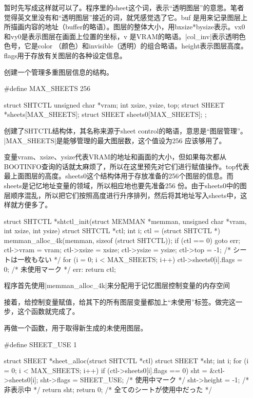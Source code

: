 暂时先写成这样就可以了。程序里的sheet这个词，表示“透明图层”的意思。笔者觉得英文里没有和“透明图层”接近的词，就凭感觉选了它。buf 是用来记录图层上所描画内容的地址（buffer的略语）。图层的整体大小，用bxsize*bysize表示。vx0和vy0是表示图层在画面上位置的坐标，v 是VRAM的略语。|col_inv|表示透明色色号，它是color （颜色）和invisible（透明）的组合略语。height表示图层高度。flags用于存放有关图层的各种设定信息。

创建一个管理多重图层信息的结构。

\begin{code}
#define MAX_SHEETS      256

struct SHTCTL {
    unsigned char *vram;
    int xsize, ysize, top;
    struct SHEET *sheets[MAX_SHEETS];
    struct SHEET sheets0[MAX_SHEETS];
};
\end{code}

创建了SHTCTL结构体，其名称来源于sheet control的略语，意思是“图层管理”。 |MAX_SHEETS|是能够管理的最大图层数，这个值设为256 应该够用了。

变量vram、xsize、ysize代表VRAM的地址和画面的大小，但如果每次都从BOOTINFO查询的话就太麻烦了，所以在这里预先对它们进行赋值操作。top代表最上面图层的高度。sheets0这个结构体用于存放准备的256个图层的信息。而sheets是记忆地址变量的领域，所以相应地也要先准备256 份。由于sheets0中的图层顺序混乱，所以把它们按照高度进行升序排列，然后将其地址写入sheets中，这样就方便多了。

\cs

\begin{code}
struct SHTCTL *shtctl_init(struct MEMMAN *memman, unsigned char *vram, int xsize, int ysize)
{
	struct SHTCTL *ctl;
	int i;
	ctl = (struct SHTCTL *) memman_alloc_4k(memman, sizeof (struct SHTCTL));
	if (ctl == 0) {
		goto err;
	}
	ctl->vram = vram;
	ctl->xsize = xsize;
	ctl->ysize = ysize;
	ctl->top = -1; /* シートは一枚もない */
	for (i = 0; i < MAX_SHEETS; i++) {
		ctl->sheets0[i].flags = 0; /* 未使用マーク */
	}
err:
	return ctl;
}
\end{code}

程序首先使用|memman_alloc_4k|来分配用于记忆图层控制变量的内存空间

接着，给控制变量赋值，给其下的所有图层变量都加上“未使用”标签。做完这一步，这个函数就完成了。

\cs

再做一个函数，用于取得新生成的未使用图层。

\begin{code}
#define SHEET_USE		1

struct SHEET *sheet_alloc(struct SHTCTL *ctl)
{
	struct SHEET *sht;
	int i;
	for (i = 0; i < MAX_SHEETS; i++) {
		if (ctl->sheets0[i].flags == 0) {
			sht = &ctl->sheets0[i];
			sht->flags = SHEET_USE; /* 使用中マーク */
			sht->height = -1; /* 非表示中 */
			return sht;
		}
	}
	return 0;	/* 全てのシートが使用中だった */
}
\end{code}

